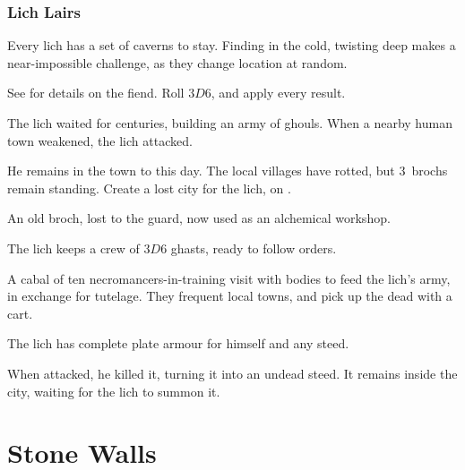 \begin{multicols}{2}
\subsubsection{Lich Lairs}
\label{lichPoint}

Every \gls{lich} has a set of caverns to stay.
Finding  in the cold, twisting \gls{deep} makes a near-impossible challenge, as they change location at random.

See  for details on the fiend.
Roll $3D6$, and apply every result.

\begin{dlist}
  \item
  The \gls{lich} waited for centuries, building an army of ghouls.
  When a nearby human town weakened, the \gls{lich} attacked.

  He remains in the town to this day.
  The local \glspl{village} have rotted, but 3~\glspl{broch} remain standing.
  Create a lost city for the \gls{lich}, on .
  \item
  An old \gls{broch}, lost to the \gls{guard}, now used as an alchemical workshop.
  \item
  The \gls{lich} keeps a crew of $3D6$ ghasts, ready to follow orders.
  \item
  A cabal of ten necromancers-in-training visit with bodies to feed the \gls{lich}'s army, in exchange for tutelage.
  They frequent local towns, and pick up the dead with a cart.
  \item
  The \gls{lich} has complete plate armour for himself and any steed.
  \item
  When  attacked, he killed it, turning it into an undead steed.
  It remains inside the city, waiting for the \gls{lich} to summon it.
\end{dlist}

\end{multicols}

\section{Stone Walls}
\label{mapStrangePlaces}

